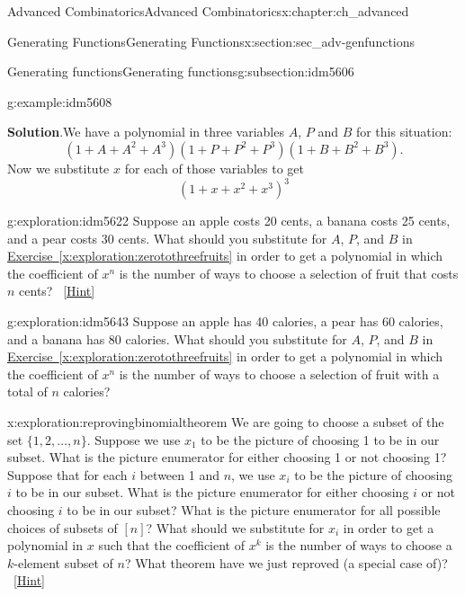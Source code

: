 \documentclass[oneside,10pt,]{book}
\numberwithin{equation}{chapter}
\begin{document}
\begin{chapterptx}{Advanced Combinatorics}{}{Advanced Combinatorics}{}{}{x:chapter:ch_advanced}
\begin{sectionptx}{Generating Functions}{}{Generating Functions}{}{}{x:section:sec_adv-genfunctions}
\begin{subsectionptx}{Generating functions}{}{Generating functions}{}{}{g:subsection:idm5606}
\begin{example}{}{g:example:idm5608}
\par\smallskip%
\noindent\textbf{Solution}.\hypertarget{g:solution:idm5614}{}\quad{}We have a polynomial in three variables \(A\), \(P\) and \(B\) for this situation:%
\begin{equation*}
(1+A +A^2 +A^3)(1+P+P^2+P^3)(1+B+B^2+B^3)\text{.}
\end{equation*}
Now we substitute \(x\) for each of those variables to get%
\begin{equation*}
(1+x+x^2+x^3)^3
\end{equation*}
%
\end{example}
\begin{exploration}{}{g:exploration:idm5622}%
Suppose an apple costs 20 cents, a banana costs 25 cents, and a pear costs 30 cents. What should you substitute for \(A\), \(P\), and \(B\) in \hyperref[x:exploration:zerotothreefruits]{Exercise~\ref{x:exploration:zerotothreefruits}} in order to get a polynomial in which the coefficient of \(x^n\) is the number of ways to choose a selection of fruit that costs \(n\) cents?%
\qquad~\hfill{\tiny\hyperlink{g:hint:idm5631-back}{[Hint]}}\end{exploration}
\begin{exploration}{}{g:exploration:idm5643}%
Suppose an apple has 40 calories, a pear has 60 calories, and a banana has 80 calories. What should you substitute for \(A\), \(P\), and \(B\) in \hyperref[x:exploration:zerotothreefruits]{Exercise~\ref{x:exploration:zerotothreefruits}} in order to get a polynomial in which the coefficient of \(x^n\) is the number of ways to choose a selection of fruit with a total of \(n\) calories?%
\end{exploration}
\begin{exploration}{}{x:exploration:reprovingbinomialtheorem}%
We are going to choose a subset of the set \(\{1,2,\ldots, n\}\). Suppose we use \(x_1\) to be the picture of choosing 1 to be in our subset. What is the picture enumerator for either choosing 1 or not choosing 1? Suppose that for each \(i\) between 1 and \(n\), we use \(x_i\) to be the picture of choosing \(i\) to be in our subset. What is the picture enumerator for either choosing \(i\) or not choosing \(i\) to be in our subset? What is the picture enumerator for all possible choices of subsets of \([n]\)? What should we substitute for \(x_i\) in order to get a polynomial in \(x\) such that the coefficient of \(x^k\) is the number of ways to choose a \(k\)-element subset of \(n\)? What theorem have we just reproved (a special case of)?%
\qquad~\hfill{\tiny\hyperlink{g:hint:idm5677-back}{[Hint]}}\end{exploration}

\end{subsectionptx}
\end{sectionptx}
\end{chapterptx}
\end{document}
